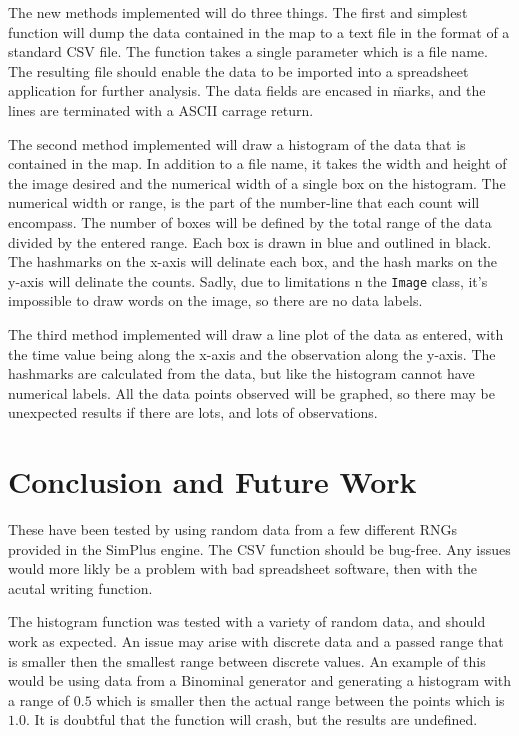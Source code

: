 \documentclass[12pt]{report}
\begin{document}
The new methods implemented will do three things.  The first and simplest function will dump the data contained in the map to a text file in the format of a standard CSV file.  The function takes a single parameter which is a file name.  The resulting file should enable the data to be imported into a spreadsheet application for further analysis.  The data fields are encased in \" marks, and the lines are terminated with a ASCII carrage return.

The second method implemented will draw a histogram of the data that is contained in the map.  In addition to a file name, it takes the width and height of the image desired and the numerical width of a single box on the histogram.  The numerical width or range, is the part of the number-line that each count will encompass.  The number of boxes will be defined by the total range of the data divided by the entered range.  Each box is drawn in blue and outlined in black.  The hashmarks on the x-axis will delinate each box, and the hash marks on the y-axis will delinate the counts.  Sadly, due to limitations n the \texttt{Image} class, it's impossible to draw words on the image, so there are no data labels.

The third method implemented will draw a line plot of the data as entered, with the time value being along the x-axis and the observation along the y-axis.  The hashmarks are calculated from the data, but like the histogram cannot have numerical labels.  All the data points observed will be graphed, so there may be unexpected results if there are lots, and lots of observations.

\section{Conclusion and Future Work}
These have been tested by using random data from a few different RNGs provided in the SimPlus engine.  The CSV function should be bug-free. Any issues would more likly be a problem with bad spreadsheet software, then with the acutal writing function.

The histogram function was tested with a variety of random data, and should work as expected.  An issue may arise with discrete data and a passed range that is smaller then the smallest range between discrete values.  An example of this would be using data from a Binominal generator and generating a histogram with a range of $0.5$ which is smaller then the actual range between the points which is $1.0$.  It is doubtful that the function will crash, but the results are undefined.
\end{document}
